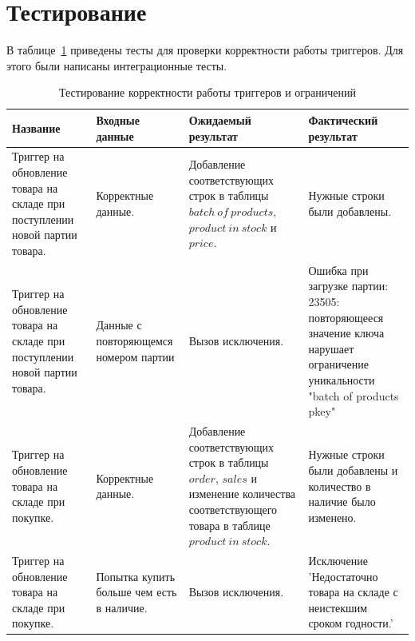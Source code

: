 \section{Тестирование}
В таблице~\ref{tab:tests} приведены тесты для проверки корректности работы триггеров. Для этого были написаны интеграционные тесты.
\begin{table}[h]
	\centering
	\caption{Тестирование корректности работы триггеров и ограничений}
	\label{tab:tests}
	\begin{tabular}{|p{3cm}|p{3cm}|p{4cm}|p{4cm}|}
		\hline
		\textbf{Название} & \textbf{Входные данные} & \textbf{Ожидаемый результат} & \textbf{Фактический результат} \\
		\hline
		Триггер на обновление товара на складе при поступлении новой партии товара. & Корректные данные. & Добавление соответствующих строк в таблицы $batch~of~products$, $product~in~stock$ и $price$. & Нужные строки были добавлены.  \\
		\hline
		Триггер на обновление товара на складе при поступлении новой партии товара. & Данные с повторяющемся номером партии & Вызов исключения. & Ошибка при загрузке партии: 23505: повторяющееся значение ключа нарушает ограничение уникальности "batch of products pkey"  \\
		\hline
		Триггер на обновление товара на складе при покупке. & Корректные данные. & Добавление соответствующих строк в таблицы $order$, $sales$ и изменение количества соответствующего товара в таблице $product~in~stock$. & Нужные строки были добавлены и количество в наличие было изменено.  \\
		\hline
		Триггер на обновление товара на складе при покупке. & Попытка купить больше чем есть в наличие. & Вызов исключения. & Исключение 'Недостаточно товара на складе с неистекшим сроком годности.' \\
		\hline
	\end{tabular}
\end{table}


